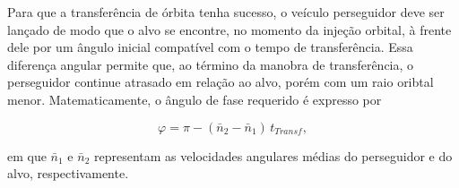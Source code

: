 Para que a transferência de órbita tenha sucesso, o veículo perseguidor deve ser lançado de modo que o alvo se encontre, no momento da injeção orbital, à frente dele por um ângulo inicial compatível com o tempo de transferência.
Essa diferença angular permite que, ao término da manobra de transferência, o perseguidor continue atrasado em relação ao alvo, porém com um raio oribtal menor.
Matematicamente, o ângulo de fase requerido é expresso por

\begin{equation}
\varphi = \pi - \left(\bar{n}_2 - \bar{n}_1\right)\,t_{Transf},
\end{equation}

em que $\bar{n}_1$ e $\bar{n}_2$ representam as velocidades angulares médias do perseguidor e do alvo, respectivamente.